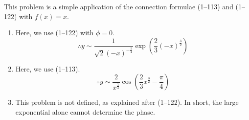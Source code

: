 \item
This problem is a simple application of the connection formulae  (1--113) and (1--122) with $f(x) = x$.

\begin{enumerate}[wide, labelindent = 0pt, label = (\alph*)]
	\item Here, we use  (1--122) with $\phi = 0$.
	      \[
		      \therefore y \sim \frac{1}{\sqrt{2} {(-x)}^{-\frac{1}{4}}} \exp\left( \frac{2}{3} {(-x)}^{\frac{3}{2}} \right)
	      \]
	\item Here, we use  (1--113).
	      \[
		      \therefore y \sim \frac{2}{x^{\frac{1}{4}}} \cos\left( \frac{2}{3}x^{\frac{3}{2}} - \frac{\pi}{4} \right)
	      \]
	\item This problem is not defined, as explained after  (1--122).
	      In short, the large exponential alone cannot determine the phase.

\end{enumerate}